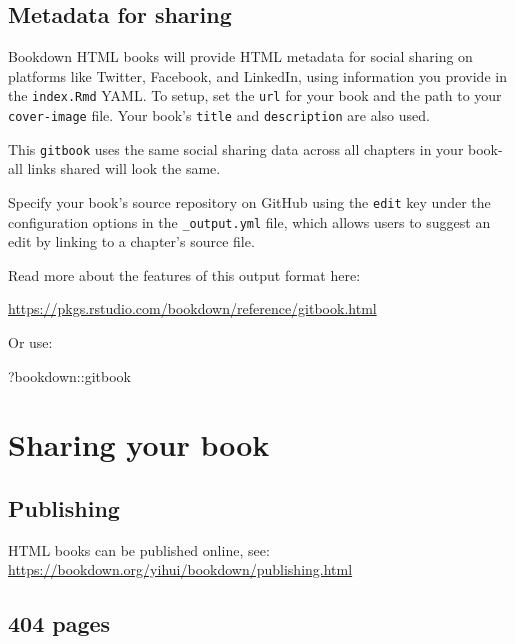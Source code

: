 \documentclass[
]{book}
\newenvironment{Shaded}{\begin{snugshade}}{\end{snugshade}}
\newcommand{\NormalTok}[1]{#1}
\newcommand{\SpecialCharTok}[1]{\textcolor[rgb]{0.00,0.00,0.00}{#1}}
\begin{document}
\hypertarget{metadata-for-sharing}{%
\section{Metadata for sharing}\label{metadata-for-sharing}}

Bookdown HTML books will provide HTML metadata for social sharing on platforms like Twitter, Facebook, and LinkedIn, using information you provide in the \texttt{index.Rmd} YAML. To setup, set the \texttt{url} for your book and the path to your \texttt{cover-image} file. Your book's \texttt{title} and \texttt{description} are also used.

This \texttt{gitbook} uses the same social sharing data across all chapters in your book- all links shared will look the same.

Specify your book's source repository on GitHub using the \texttt{edit} key under the configuration options in the \texttt{\_output.yml} file, which allows users to suggest an edit by linking to a chapter's source file.

Read more about the features of this output format here:

\url{https://pkgs.rstudio.com/bookdown/reference/gitbook.html}

Or use:

\begin{Shaded}
\begin{Highlighting}[]
\NormalTok{?bookdown}\SpecialCharTok{::}\NormalTok{gitbook}
\end{Highlighting}
\end{Shaded}

\hypertarget{sharing-your-book-1}{%
\chapter{Sharing your book}\label{sharing-your-book-1}}

\hypertarget{publishing-1}{%
\section{Publishing}\label{publishing-1}}

HTML books can be published online, see: \url{https://bookdown.org/yihui/bookdown/publishing.html}

\hypertarget{pages-1}{%
\section{404 pages}\label{pages-1}}
\end{document}
